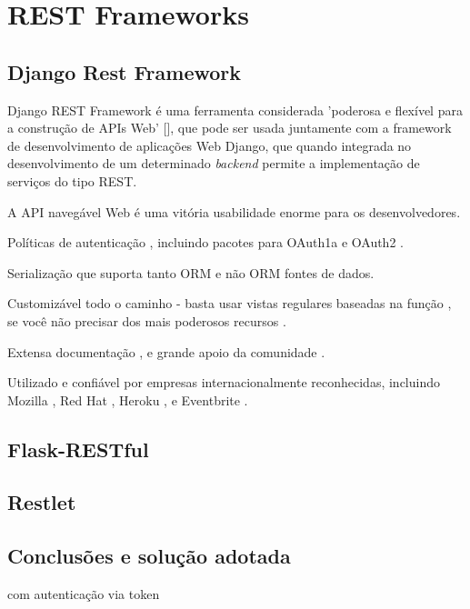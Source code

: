 \newpage
\section{REST Frameworks}




\subsection{Django Rest Framework}





Django REST Framework é uma ferramenta considerada 'poderosa e flexível para a construção de APIs Web' [], que pode ser usada juntamente com a framework de desenvolvimento de aplicações Web Django, que quando integrada no desenvolvimento de um determinado \textit{backend} permite a implementação de serviços do tipo REST.



A API navegável Web é uma vitória usabilidade enorme para os desenvolvedores.

Políticas de autenticação , incluindo pacotes para OAuth1a e OAuth2 .

Serialização que suporta tanto ORM e não ORM fontes de dados.

Customizável todo o caminho - basta usar vistas regulares baseadas na função , se você não  precisar dos mais poderosos recursos .

Extensa documentação , e grande apoio da comunidade .

Utilizado e confiável por empresas internacionalmente reconhecidas, incluindo Mozilla , 
Red Hat , Heroku , e Eventbrite .




\subsection{Flask-RESTful}


\subsection{Restlet}



\subsection{Conclusões e solução adotada}




com autenticação via token 







